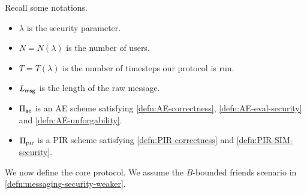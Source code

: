 Recall some notations.
\begin{itemize}
    \item $\lambda$ is the security parameter.
    \item $N = N(\lambda)$ is the number of users.
    \item $T = T(\lambda)$ is the number of timesteps our protocol is run.
    \item $L_{\mathsf{msg}}$ is the length of the raw message.
    \item $\Pi_{\mathsf{ae}}$ is an AE scheme satisfying \cref{defn:AE-correctness}, \cref{defn:AE-eval-security} and \cref{defn:AE-unforgability}.
    \item $\Pi_{\text{pir}}$ is a PIR scheme satisfying \cref{defn:PIR-correctness} and \cref{defn:PIR-SIM-security}.
\end{itemize}
We now define the core protocol. We assume the $B$-bounded friends scenario in \cref{defn:messaging-security-weaker}.
